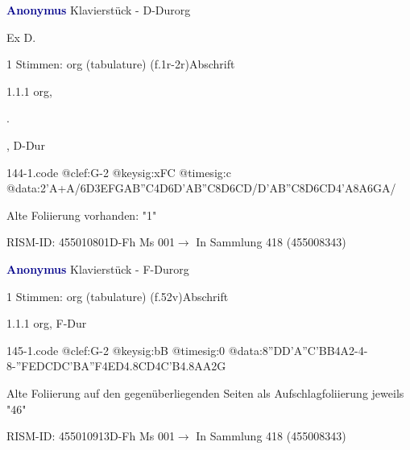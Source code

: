 \documentclass[twocolumn, 12pt]{book}
\begin{document}
\par \vspace{16pt} \textcolor{darkblue}{\textbf{Anonymus  }}\hfillplus{\textbf{[144]}}\newline Klavierstück - D-Dur\newline org
\par \begin{itshape}[f.1r, at left:] Ex D.\end{itshape} 
\par \textcolor{darkblue}{}  1 Stimmen: org (tabulature)  (f.1r-2r)\newline Abschrift
\par 1.1.1  org, \begin{itshape}.\end{itshape}, D-Dur  
\begin{filecontents*}{144-1.code}
@clef:G-2
@keysig:xFC
@timesig:c
@data:2'A+A/{6D3EF}{GAB''C}4D{6D'AB''C}{8D6CD}/{D'AB''C}{8D6CD}4'A{8A6GA}/
\end{filecontents*}
\newline %
\par Alte Foliierung vorhanden: "1"
\par RISM-ID: 455010801\newline D-Fh  Ms 001\newline $\rightarrow$ In Sammlung 418 (455008343)
      
\par \vspace{16pt} \textcolor{darkblue}{\textbf{Anonymus  }}\hfillplus{\textbf{[145]}}\newline Klavierstück - F-Dur\newline org
\par \begin{itshape}\end{itshape} 
\par \textcolor{darkblue}{}  1 Stimmen: org (tabulature)  (f.52v)\newline Abschrift
\par 1.1.1  org, F-Dur  
\begin{filecontents*}{145-1.code}
@clef:G-2
@keysig:bB
@timesig:0
@data:{8''DD'A''C}{'BB}4A2-4-8-''F{EDCD}{C'BA''F}4ED4.8CD4C'B4.8AA2G
\end{filecontents*}
\newline %
\par Alte Foliierung auf den gegenüberliegenden Seiten als Aufschlagfoliierung jeweils "46"
\par RISM-ID: 455010913\newline D-Fh  Ms 001\newline $\rightarrow$ In Sammlung 418 (455008343)
      
\end{document}
